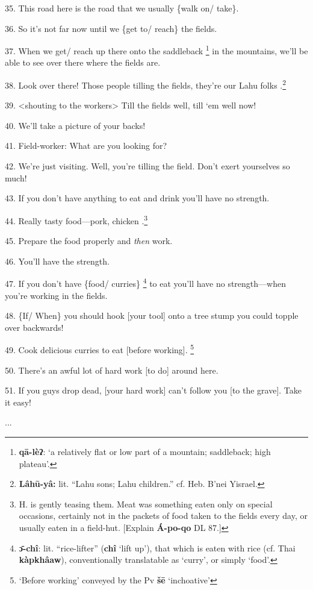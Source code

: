 35. This road here is the road that we usually \{walk on/ take\}.

36. So it's not far now until we \{get to/ reach\} the fields.

37. When we get/ reach up there onto the saddleback \footnote{\textbf{qā-lèʔ}: `a relatively flat or low part of a mountain; saddleback; high plateau'.} in the mountains, we'll
be able to see over there where the fields are.

38. Look over there! Those people tilling the fields, they're our Lahu folks .\footnote{\textbf{Lâhū-yâ:} lit. ``Lahu sons; Lahu children.'' cf. Heb. B'nei Yisrael.}

39. <shouting to the workers> Till the fields well, till `em
well now!

40. We'll take a picture of your backs!

41. Field-worker: What are you looking for?

42. We're just visiting. Well, you're tilling the field. Don't exert yourselves
so much!

43. If you don't have anything to eat and drink you'll have no strength.

44. Really tasty food---pork, chicken .\footnote{H. is gently teasing them. Meat was something eaten only on special occasions, certainly not in the packets of food taken to the fields every day, or usually eaten in a field-hut. [Explain \textbf{Á-po-qo} DL 87.]}

45. Prepare the food properly and \textit{then} work.

46. You'll have the strength.

47. If you don't have \{food/ curries\} \footnote{\textbf{ɔ̄-chî}: lit. ``rice-lifter'' (\textbf{chî }`lift up'), that which is eaten with rice (cf. Thai \textbf{kàpkhâaw}), conventionally translatable as `curry', or simply `food'.} to eat you'll have no strength---when
you're working in the fields.

48. \{If/ When\} you should hook [your tool] onto a tree stump you could topple
over backwards!

49. Cook delicious curries to eat [before working]. \footnote{`Before working' conveyed by the Pv \textbf{šē }`inchoative'}

50. There's an awful lot of hard work [to do] around here.

51. If you guys drop dead, [your hard work] can't follow you [to the grave]. Take
it easy!

...

